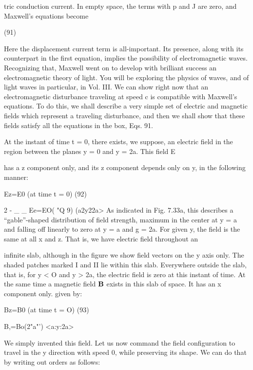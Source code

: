 tric conduction current. In empty space, the terms with p and J are
zero, and Maxwell's equations become

\begin{equation}
\end{equation}
(91)

 

Here the displacement current term is all-important. Its presence,
along with its counterpart in the first equation, implies the possibility
of electromagnetic waves. Recognizing that, Maxwell went on to
develop with brilliant success an electromagnetic theory of light.
You will be exploring the physics of waves, and of light waves in
particular, in Vol. III. We can show right now that an electromagnetic
disturbance traveling at speed c is compatible with Maxwell's
equations. To do this, we shall describe a very simple set of electric
and magnetic fields which represent a traveling disturbance, and
then we shall show that these fields satisfy all the equations in the
box, Eqs. 91.

At the instant of time t = 0, there exists, we suppose, an electric
field in the region between the planes y = 0 and y = 2a. This field E

has a z component only, and its z component depends only on y, in
the following manner:

\begin{equation}
\end{equation}
Ez=E0%
(at time t = 0) (92)

2 - _ _
Ee=EO( "Q 9) (a2y22a>
As indicated in Fig. 7.33a, this describes a ``gable''-shaped distribution
of field strength, maximum in the center at y = a and falling off
linearly to zero at y = a and g = 2a. For given y, the field is the
same at all x and z. That is, we have electric field throughout an

infinite slab, although in the figure we show field vectors on the y axis
only. The shaded patches marked I and II lie within this slab.
Everywhere outside the slab, that is, for y < O and y > 2a, the electric
field is zero at this instant of time. At the same time a magnetic
field $\mathbf{B}$ exists in this slab of space. It has an x component only.
given by:

\begin{equation}
\end{equation}
Bz=B0%
(at time t = O) (93)

B,=Bo(2"a"') <a:y:2a>

We simply invented this field. Let us now command the field
configuration to travel in the y direction with speed 0, while preserving
its shape. We can do that by writing out orders as follows:

